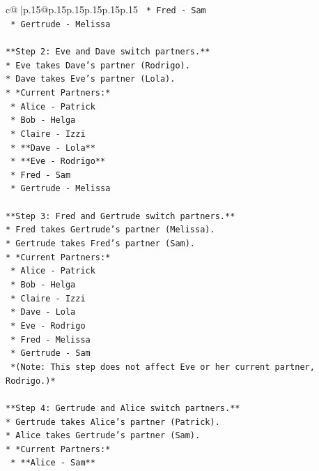 \documentclass{article}
\begin{document}
{\begin{supertabular}{c@{$\;$}|p{.15\linewidth}@{}p{.15\linewidth}p{.15\linewidth}p{.15\linewidth}p{.15\linewidth}p{.15\linewidth}}
{{{\texttt{    *   Fred {-} Sam} \\
\texttt{    *   Gertrude {-} Melissa} \\
\\ 
\texttt{**Step 2: Eve and Dave switch partners.**} \\
\texttt{*   Eve takes Dave's partner (Rodrigo).} \\
\texttt{*   Dave takes Eve's partner (Lola).} \\
\texttt{*   *Current Partners:*} \\
\texttt{    *   Alice {-} Patrick} \\
\texttt{    *   Bob {-} Helga} \\
\texttt{    *   Claire {-} Izzi} \\
\texttt{    *   **Dave {-} Lola**} \\
\texttt{    *   **Eve {-} Rodrigo**} \\
\texttt{    *   Fred {-} Sam} \\
\texttt{    *   Gertrude {-} Melissa} \\
\\ 
\texttt{**Step 3: Fred and Gertrude switch partners.**} \\
\texttt{*   Fred takes Gertrude's partner (Melissa).} \\
\texttt{*   Gertrude takes Fred's partner (Sam).} \\
\texttt{*   *Current Partners:*} \\
\texttt{    *   Alice {-} Patrick} \\
\texttt{    *   Bob {-} Helga} \\
\texttt{    *   Claire {-} Izzi} \\
\texttt{    *   Dave {-} Lola} \\
\texttt{    *   Eve {-} Rodrigo} \\
\texttt{    *   Fred {-} Melissa} \\
\texttt{    *   Gertrude {-} Sam} \\
\texttt{    *(Note: This step does not affect Eve or her current partner, Rodrigo.)*} \\
\\ 
\texttt{**Step 4: Gertrude and Alice switch partners.**} \\
\texttt{*   Gertrude takes Alice's partner (Patrick).} \\
\texttt{*   Alice takes Gertrude's partner (Sam).} \\
\texttt{*   *Current Partners:*} \\
\texttt{    *   **Alice {-} Sam**} \\
}}}
\end{supertabular}}
\end{document}
